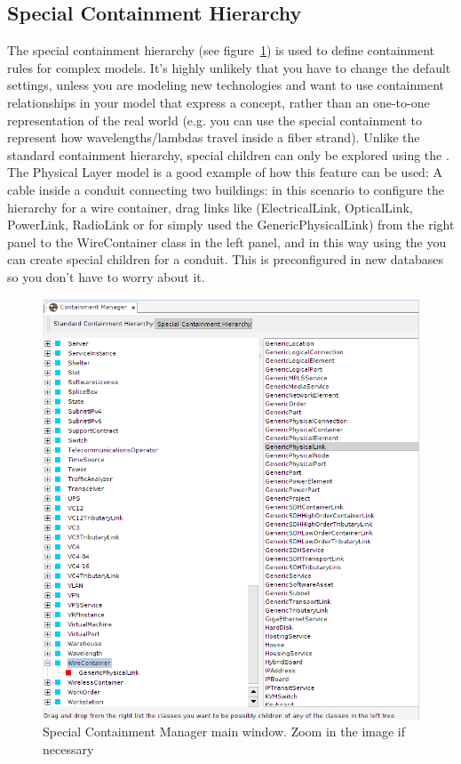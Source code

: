 \documentclass[a4paper]{article}
\begin{document}
	\newpage
	
	\subsection{Special Containment Hierarchy} \label{sec:special_containment_hierarchy}
	The special containment hierarchy (see figure~\ref{fig:special_containment_manager}) is used to define containment rules for complex models. It's highly unlikely that you have to change the default settings, unless you are modeling new technologies and want to use containment relationships in your model that express a concept, rather than an one-to-one representation of the real world (e.g. you can use the special containment to represent how wavelengths/lambdas travel inside a fiber strand). Unlike the standard containment hierarchy, special children can only be explored using the \textbf{}. The Physical Layer model is a good example of how this feature can be used: A cable inside a conduit connecting two buildings: in this scenario to configure the hierarchy for a wire container, drag links like (ElectricalLink, OpticalLink, PowerLink, RadioLink or for simply used the GenericPhysicalLink) from the right panel to the WireContainer class in the left panel, and in this way using the \textbf{} you can create special children for a conduit. This is preconfigured in new databases so you don't have to worry about it.
	
	\begin{figure}[h!]
		\centering
		\includegraphics[width=0.8\linewidth]{img/special_containment_manager.png}
		\caption{Special Containment Manager main window. Zoom in the image if necessary}
		\label{fig:special_containment_manager}
	\end{figure}
	
\end{document}
